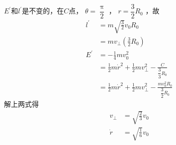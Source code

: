 \clearpage\noindent $ E ^ { \prime } $和$ l ^ { \prime } $是不变的，在$ C $点， $ \theta = \dfrac { \uppi } { 2 } $ ， $ r = \dfrac { 3 } { 2 } R _ { 0 } $ ，故
\begin{equation*}
  \begin{split}
    l ^ { \prime } &= m \sqrt { \frac { 3 } { 2 } } v _ { 0 } R _ { 0 } \\
    &= m v _ { \bot } \left( \frac { 3 } { 2 } R _ { 0 } \right) \\
    E ^ { \prime } &= - \frac { 1 } { 4 } m v _ 0 ^ { 2 } \\
    &= \frac { 1 } { 2 } m \dot { r } ^ { 2 } + \frac { 1 } { 2 } m v _ { \bot } ^ { 2 } - \frac { C } { \dfrac { 3 } { 3 } R _ { 0 } } \\
    &= \frac { 1 } { 2 } m \dot { r } ^ { 2 } + \frac { 1 } { 2 } m v _ { \bot } ^ { 2 } - \frac { m v _ 0 ^ 2 R _ 0 } { \dfrac { 3 } { 2 } R _ { 0 } }
  \end{split}
\end{equation*}
解上两式得
\begin{equation*}
  \begin{split}
    v _ { \bot } &= \sqrt { \frac { 2 } { 3 } } v _ { 0 } \\
    \dot { r } &= \sqrt { \frac { 1 } { 6 } } v _ { 0 }
  \end{split}
\end{equation*}
